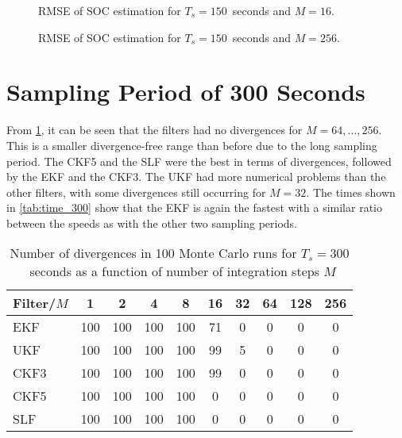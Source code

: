 \documentclass[../zhang_thesis.tex]{subfiles}
\begin{document}
\begin{figure}[h]
\centering
%
\caption{RMSE of SOC estimation for $T_s=150$~seconds and $M=16$.}
\label{fig:rmse_150_16}
\end{figure}

\begin{figure}
\centering
%
\caption{RMSE of SOC estimation for $T_s=150$~seconds and $M=256$.}
\label{fig:rmse_150_256}
\end{figure}

\clearpage

\section{Sampling Period of 300 Seconds}

From \cref{tab:div_300}, it can be seen that the filters had no divergences for $M=64,\dots,256$. This is a smaller divergence-free range than before due to the long sampling period. The CKF5 and the SLF were the best in terms of divergences, followed by the EKF and the CKF3. The UKF had more numerical problems than the other filters, with some divergences still occurring for $M=32$. The times shown in \cref{tab:time_300} show that the EKF is again the fastest with a similar ratio between the speeds as with the other two sampling periods. 

\begin{table}[h]
\centering
\caption{Number of divergences in 100 Monte Carlo runs for $T_s=300$~seconds as a function of number of integration steps $M$}
\begin{tabular}{@{}l*{9}{c}@{}}
\toprule
Filter/$M$ & 1   & 2   & 4   & 8   & 16  & 32 & 64 & 128 & 256 \\
\midrule
EKF        & 100 & 100 & 100 & 100 & 71  & 0  & 0  & 0   & 0   \\
UKF        & 100 & 100 & 100 & 100 & 99  & 5  & 0  & 0   & 0   \\
CKF3       & 100 & 100 & 100 & 100 & 99  & 0  & 0  & 0   & 0   \\
CKF5       & 100 & 100 & 100 & 100 & 0   & 0  & 0  & 0   & 0   \\
SLF        & 100 & 100 & 100 & 100 & 0   & 0  & 0  & 0   & 0   \\
\bottomrule
\end{tabular}
\label{tab:div_300}
\end{table}
\end{document}
